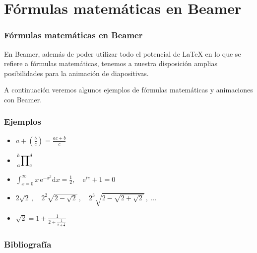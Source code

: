 \documentclass{beamer}
\begin{document}

\section{Fórmulas matemáticas en Beamer}


\begin{frame}
  \frametitle{Fórmulas matemáticas en Beamer}
  \begin{block}{}
    En Beamer, además de poder utilizar todo el potencial de \LaTeX{} en lo que 
    se refiere a fórmulas matemáticas, tenemos a nuestra disposición amplias 
    posibilidades para la animación de diapositivas.
  \end{block}
  \vspace{1 true cm}
  \begin{block}{}
   A continuación veremos algunos ejemplos de fórmulas matemáticas y animaciones 
   con Beamer.
  \end{block}
  
\end{frame}


\begin{frame}
  \frametitle{Ejemplos}
  
  \begin{itemize}[<+->]
    \item $a + \left(\frac{b}{c}\right)= \frac{ac+b}{c}$
    \item $\sideset{_{a}^{b}}{_{c}^{d}}\prod$
    \item $\int_{x=0}^{\infty} x\,\text{e}^{-x^2}\text{d}x=\frac{1}{2},\quad\text{e}^{i\pi}+1=0$
    \item $2\sqrt{2}\,,\quad 2^2\sqrt{2-\sqrt{2}}\,,\quad 2^3\sqrt{2-\sqrt{2+\sqrt{2}}}\,,\;\ldots$
    \item $\sqrt 2 = 1+\frac{1}{2+\frac{1}{2+\frac{1}{\ddots}}}$
  \end{itemize}
\end{frame}
  
  
\begin{frame}
  \frametitle{Bibliografía}
  
  
  \nocite{*}
\end{frame}  

\end{document}
